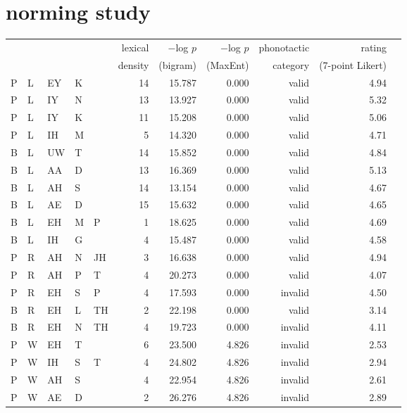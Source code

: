 \section{\citet{Albright2007} norming study}

\begin{longtable}{l@{ } l@{ } l@{ } l@{ } l r r r r r r}
\toprule
   &   &   &   &    & lexical & $-$log $p$ & $-$log $p$ & phonotactic & rating \\
   &   &   &   &    & density & (bigram)   & (MaxEnt)   & category    & (7-point Likert) \\
\midrule
P & L & EY & K &    & 14 & 15.787 &  0.000  &  valid   & 4.94 \\
P & L & IY & N &    & 13 & 13.927 &  0.000  &  valid   & 5.32 \\
P & L & IY & K &    & 11 & 15.208 &  0.000  &  valid   & 5.06 \\
P & L & IH & M &    &  5 & 14.320 &  0.000  &  valid   & 4.71 \\
B & L & UW & T &    & 14 & 15.852 &  0.000  &  valid   & 4.84 \\
B & L & AA & D &    & 13 & 16.369 &  0.000  &  valid   & 5.13 \\
B & L & AH & S &    & 14 & 13.154 &  0.000  &  valid   & 4.67 \\
B & L & AE & D &    & 15 & 15.632 &  0.000  &  valid   & 4.65 \\
B & L & EH & M &  P &  1 & 18.625 &  0.000  &  valid   & 4.69 \\
B & L & IH & G &    &  4 & 15.487 &  0.000  &  valid   & 4.58 \\
P & R & AH & N & JH &  3 & 16.638 &  0.000  &  valid   & 4.94 \\
P & R & AH & P &  T &  4 & 20.273 &  0.000  &  valid   & 4.07 \\
P & R & EH & S &  P &  4 & 17.593 &  0.000  &  invalid & 4.50 \\
B & R & EH & L & TH &  2 & 22.198 &  0.000  &  valid   & 3.14 \\
B & R & EH & N & TH &  4 & 19.723 &  0.000  &  invalid & 4.11 \\
P & W & EH & T &    &  6 & 23.500 &  4.826  &  invalid & 2.53 \\
P & W & IH & S &  T &  4 & 24.802 &  4.826  &  invalid & 2.94 \\
P & W & AH & S &    &  4 & 22.954 &  4.826  &  invalid & 2.61 \\
P & W & AE & D &    &  2 & 26.276 &  4.826  &  invalid & 2.89 \\

\end{longtable}
